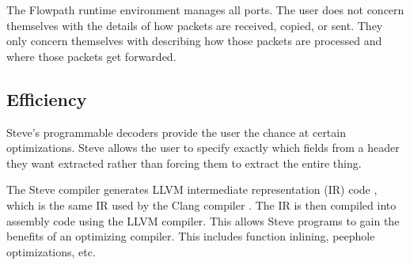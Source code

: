 The Flowpath runtime environment manages all ports. The user does not concern themselves with the details of how packets are received, copied, or sent. They only concern themselves with describing how those packets are processed and where those packets get forwarded.

\subsection{Efficiency}

Steve's programmable decoders provide the user the chance at certain optimizations. Steve allows the user to specify exactly which fields from a header they want extracted rather than forcing them to extract the entire thing. 

The Steve compiler generates LLVM intermediate representation (IR) code \cite{llvm_webpage}, which is the same IR used by the Clang compiler \cite{clang_webpage}. The IR is then compiled into assembly code using the LLVM compiler. This allows Steve programs to gain the benefits of an optimizing compiler. This includes function inlining, peephole optimizations, etc.


